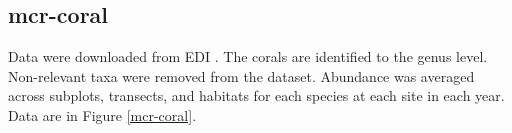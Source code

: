 \documentclass[11pt, oneside]{article}
\begin{document}


\subsection {mcr-coral}
Data were downloaded from EDI \citep{mcr-coral}.
The corals are identified to the genus level.
Non-relevant taxa were removed from the dataset.
Abundance was averaged across subplots, transects, and habitats for each species at each site in each year.
Data are in Figure \ref{mcr-coral}.
\end{document}
